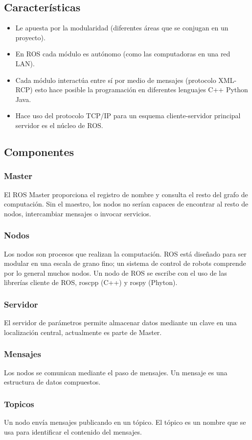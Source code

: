 \documentclass[12pt,a4paper]{article}
\begin{document}
\subsection{Características}
\begin{itemize}
\item Le apuesta por la modularidad (diferentes áreas que se conjugan en un proyecto). 
\item En ROS cada módulo es autónomo (como las computadoras en una red LAN).
\item Cada módulo interactúa entre sí por medio de mensajes (protocolo XML-RCP) esto hace posible la programación en diferentes lenguajes C++ Python Java. 
\item Hace uso del protocolo TCP/IP para un esquema cliente-servidor principal servidor es el núcleo de ROS. 
\end{itemize}
\subsection{Componentes}
\subsubsection{Master}
El ROS Master proporciona el registro de nombre y consulta el resto del grafo de computación. Sin el maestro, los nodos no serían capaces de encontrar al resto de nodos, intercambiar mensajes o invocar servicios.
\subsubsection{Nodos}
Los nodos son procesos que realizan la computación. ROS está diseñado para ser modular en una escala de grano fino; un sistema de control de robots comprende por lo general muchos nodos. Un nodo de ROS se escribe con el uso de las librerías cliente de ROS, roscpp (C++) y rospy (Phyton).
\subsubsection{Servidor}
El servidor de parámetros permite almacenar datos mediante un clave en una localización central, actualmente es parte de Master.
\subsubsection{Mensajes}
Los nodos se comunican mediante el paso de mensajes. Un mensaje es una estructura de datos compuestos. 
\subsubsection{Topicos}
Un nodo envía mensajes publicando en un tópico. El tópico es un nombre que se usa para identificar el contenido del mensajes. 
\end{document}

